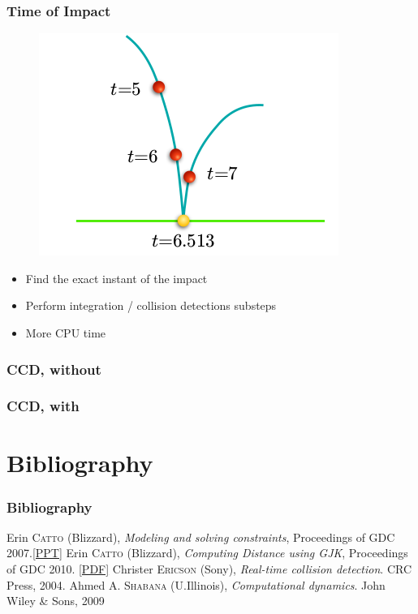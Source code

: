 \documentclass{beamer}
\begin{document}
\begin{frame}
  \frametitle{Time of Impact}

  \begin{figure}[p]
    \centering
    \includegraphics[width=0.5\linewidth]{ccd6}
  \end{figure}

  \begin{itemize}
  \item Find the exact instant of the impact
  \item Perform integration / collision detections substeps
  \item More CPU time
  \end{itemize}
  
\end{frame}

\begin{frame}
  \frametitle{CCD, without}
  \begin{centering}
  \end{centering}
\end{frame}

\begin{frame}
  \frametitle{CCD, with}
  \begin{centering}
  \end{centering}
\end{frame}

\section*{Bibliography}

\begin{frame}
 \frametitle{Bibliography} 
  \begin{thebibliography}{9}
   Erin \textsc{Catto} (Blizzard), \emph{Modeling and solving constraints}, Proceedings of GDC 2007.\href{http://box2d.org/files/GDC2007/GDC2007_Catto_Erin_Physics1.ppt}{[PPT]} 
   Erin \textsc{Catto} (Blizzard), \emph{Computing Distance using GJK}, Proceedings of GDC 2010. \href{http://box2d.org/files/GDC2010/GDC2010_Catto_Erin_GJK.pdf}{[PDF]}
   Christer \textsc{Ericson} (Sony), \emph{Real-time collision detection}. CRC Press, 2004.
   Ahmed A. \textsc{Shabana} (U.Illinois), \emph{Computational dynamics}. John Wiley \& Sons, 2009
  \end{thebibliography}
\end{frame}
\end{document}
